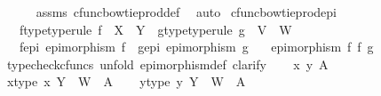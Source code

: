 \begin{isabellebody}
\ \ \ \ \isamarkupfalse%
\ assms{\isacharparenleft}{\kern0pt}{}{\isacharcomma}{\kern0pt}{}{\isacharparenright}{\kern0pt}\ cfunc{\isacharunderscore}{\kern0pt}bowtie{\isacharunderscore}{\kern0pt}prod{\isacharunderscore}{\kern0pt}def{}\ \isamarkupfalse%
\ auto\isanewline
{}\isamarkupfalse%
%
\endisatagproof
{\isafoldproof}%
%
\isadelimproof
\isanewline
%
\endisadelimproof
\isanewline
{}\isamarkupfalse%
\ cfunc{\isacharunderscore}{\kern0pt}bowtieprod{\isacharunderscore}{\kern0pt}epi{\isacharcolon}{\kern0pt}\isanewline
\ \ \ f{\isacharunderscore}{\kern0pt}type{\isacharbrackleft}{\kern0pt}type{\isacharunderscore}{\kern0pt}rule{\isacharbrackright}{\kern0pt}{\isacharcolon}{\kern0pt}\ {\isachardoublequoteopen}f\ {\isacharcolon}{\kern0pt}\ X\ {\isasymrightarrow}\ Y{\isachardoublequoteclose}\ \ g{\isacharunderscore}{\kern0pt}type{\isacharbrackleft}{\kern0pt}type{\isacharunderscore}{\kern0pt}rule{\isacharbrackright}{\kern0pt}{\isacharcolon}{\kern0pt}\ {\isachardoublequoteopen}g\ {\isacharcolon}{\kern0pt}\ V\ {\isasymrightarrow}\ W{\isachardoublequoteclose}\isanewline
\ \ \ f{\isacharunderscore}{\kern0pt}epi{\isacharcolon}{\kern0pt}\ {\isachardoublequoteopen}epimorphism\ f{\isachardoublequoteclose}\ \ g{\isacharunderscore}{\kern0pt}epi{\isacharcolon}{\kern0pt}\ {\isachardoublequoteopen}epimorphism\ g{\isachardoublequoteclose}\isanewline
\ \ \ {\isachardoublequoteopen}epimorphism\ {\isacharparenleft}{\kern0pt}f\ {\isasymbowtie}\isactrlsub f\ g{\isacharparenright}{\kern0pt}{\isachardoublequoteclose}\isanewline
%
\isadelimproof
%
\endisadelimproof
%
\isatagproof
{}\isamarkupfalse%
\ {\isacharparenleft}{\kern0pt}typecheck{\isacharunderscore}{\kern0pt}cfuncs{\isacharcomma}{\kern0pt}\ unfold\ epimorphism{\isacharunderscore}{\kern0pt}def{}{\isacharcomma}{\kern0pt}\ clarify{\isacharparenright}{\kern0pt}\isanewline
\ \ \isamarkupfalse%
\ x\ y\ A\isanewline
\ \ \isamarkupfalse%
\ x{\isacharunderscore}{\kern0pt}type{\isacharcolon}{\kern0pt}\ {\isachardoublequoteopen}x{\isacharcolon}{\kern0pt}\ Y\ {\isasymCoprod}\ W\ {\isasymrightarrow}\ A{\isachardoublequoteclose}\isanewline
\ \ \isamarkupfalse%
\ y{\isacharunderscore}{\kern0pt}type{\isacharcolon}{\kern0pt}\ {\isachardoublequoteopen}y{\isacharcolon}{\kern0pt}\ Y\ {\isasymCoprod}\ W\ {\isasymrightarrow}\ A{\isachardoublequoteclose}\isanewline
\ \ \isamarkupfalse%

\end{isabellebody}
